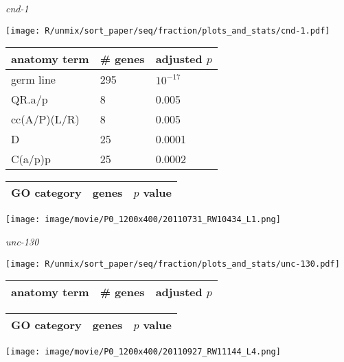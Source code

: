 \documentclass[serif,9pt]{beamer}
\begin{document}
\begin{frame}{{\em cnd-1}}
\begin{minipage}{0.4\textwidth}
\texttt{[image: R/unmix/sort\_paper/seq/fraction/plots\_and\_stats/cnd-1.pdf]}
\end{minipage}
\begin{minipage}{0.58\textwidth}
\begin{table}[!tbp]\scriptsize
\begin{tabular}{lll}
anatomy term & \# genes & adjusted $p$ \\
\hline
germ line & 295 & $10^{-17}$ \\
QR.a/p & 8 & 0.005 \\
cc(A/P)(L/R) & 8 & 0.005 \\
D & 25 & 0.0001 \\
C(a/p)p & 25 & 0.0002 
\end{tabular}
\end{table}
\end{minipage}

\begin{table}\footnotesize
\begin{tabular}{llr}
GO category & genes & $p$ value \\
\hline

\end{tabular}
\end{table}

\texttt{[image: image/movie/P0\_1200x400/20110731\_RW10434\_L1.png]}

\end{frame}

\begin{frame}{{\em unc-130}}

\begin{minipage}{0.4\textwidth}
\texttt{[image: R/unmix/sort\_paper/seq/fraction/plots\_and\_stats/unc-130.pdf]}
\end{minipage}
\begin{minipage}{0.58\textwidth}
\begin{table}[!tbp]\scriptsize
\begin{tabular}{lll}
anatomy term & \# genes & adjusted $p$ \\
\hline

\end{tabular}
\end{table}
\end{minipage}

\begin{table}\footnotesize
\begin{tabular}{llr}
GO category & genes & $p$ value \\
\hline

\end{tabular}
\end{table}

\texttt{[image: image/movie/P0\_1200x400/20110927\_RW11144\_L4.png]}

\end{frame}
\end{document}
